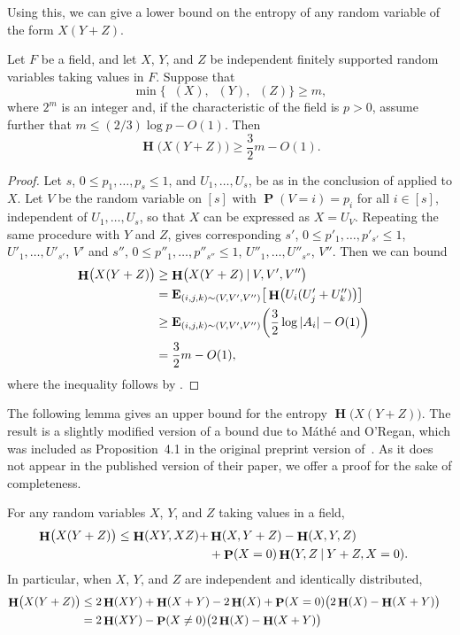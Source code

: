 \documentclass[twoside, 10pt]{article}
\newcommand\ex{{\mathbf{E}}}
\DeclareMathOperator{\Eta}{\mathbf{H}}
\DeclareMathOperator{\Etamin}{\mathbf{H}_\infty}
\DeclareMathOperator{\pr}{\mathbf{P}}
\newcommand\given{\mathbin{|}}
\begin{document}
Using this, we can give a lower bound on the entropy of any 
random variable of the form $X(Y+Z)$. 

\begin{lemma}
\label{lemHminlowerbound}
Let $F$ be a field, and let $X$, $Y$, and $Z$ be independent finitely supported random variables taking values in $F$. Suppose that
$$\min\bigl\{ \Etamin(X), \Etamin(Y), \Etamin(Z)\bigr\} \ge m,$$
where $2^m$ is an integer and,
if the characteristic of the field is $p>0$, assume further 
that $m\le (2/3)\log p - O(1)$. Then
$$
\Eta\bigl(X(Y+Z)\bigr) \ge \frac32 m - O(1).
$$
\end{lemma}

\begin{proof}
Let $s$, $0\le p_1,\ldots,p_s\le 1$, and $U_1,\ldots,U_s$, be as
in the conclusion of  applied to $X$.
Let $V$ be the random variable on $[s]$ with $\pr(V=i) = p_i$ 
for all $i\in [s]$, independent of $U_1,\ldots,U_s$, so that
$X$ can be expressed as $X=U_V$.
Repeating the same procedure with $Y$ and $Z$, gives
corresponding 
$s'$, $0\le p'_1,\ldots,p'_{s'}\le 1$, $U'_1,\ldots,U'_{s'}$, $V'$
and
$s''$, $0\le p''_1,\ldots,p''_{s''}\le 1$, $U''_1,\ldots,U''_{s''}$, $V''$.
Then we can bound
\begin{equation}\begin{aligned}
\Eta\bigl(X(Y+Z)\bigr) &\ge \Eta\bigl(X(Y+Z) \given V, V', V''\bigr)\cr
&= \ex_{(i,j,k)\sim (V,V',V'')} \big[\Eta\bigl(U_i(U_j'+U_k'')\bigr)\big]\cr
&\ge \ex_{(i,j,k)\sim (V,V',V'')} \biggl( \frac32\log |A_i| - O(1)\biggr) \cr
&= \frac32 m - O(1), 
\end{aligned}\end{equation}
where the inequality follows by .
\end{proof}

The following lemma gives 
an upper bound for the entropy $\Eta\bigl( X(Y+Z)\bigr)$. 
The result is a slightly modified version of a bound
due to M\'ath\'e and O'Regan, which was included
as Proposition~4.1 in the original preprint 
version of~\cite{matheoregan}. As it does not appear
in the published version of their paper,
we offer a proof for the sake of completeness.

\begin{lemma}\label{lemMO}
For any random variables $X$, $Y$, and $Z$ taking values in a field,
\begin{align}\label{eqMOone}
\Eta\bigl( X(Y+Z)\bigr) \le \Eta(XY, XZ) + &\Eta(X, Y+Z) - \Eta(X,Y,Z) \cr
&+ \pr(X=0)\Eta(Y,Z\given Y+Z,X=0).
\end{align}
In particular, when $X$, $Y$, and $Z$ are independent 
and identically distributed, 
\begin{align}\label{eqMOtwo}
\Eta\bigl( X(Y+Z)\bigr) &\le 2\Eta(XY) + \Eta(X+Y) - 2\Eta(X) + \pr(X=0)\bigl(2\Eta(X) - \Eta(X+Y)\bigr) \cr
&= 2\Eta(XY) - \pr(X\ne 0)\bigl(2\Eta(X) - \Eta(X+Y)\bigr)\cr
\end{align}
\end{lemma}
\end{document}
